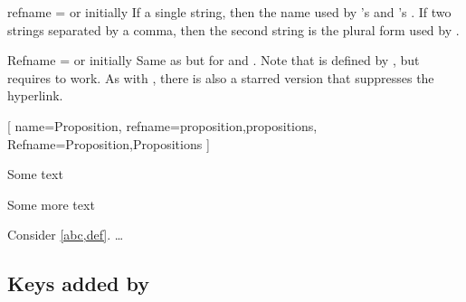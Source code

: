 \documentclass{ltxdoc}
\begin{document}
\begin{docKey}{refname}
  {= \textrm{or} }
  {initially }
If a single string, then the name used by 's  and 's .
If two strings separated by a comma, then the second string is the plural form used by .
\end{docKey}

\begin{docKey}{Refname}
  {= \textrm{or} }
  {initially }
Same as  but for  and .
Note that  is defined by , but requires  to work.
As with , there is also a starred version  that suppresses the hyperlink.

\begin{tcbwritetemp}
[
  name=Proposition,
  refname={proposition,propositions},
  Refname={Proposition,Propositions}
  ]
\end{tcbwritetemp}

\begin{keythmscode}[withpreamble]
\begin{prop}[label=abc]
Some text
\end{prop}
\begin{prop}[label=def]
Some more text
\end{prop}
\begin{theorem}
Consider \cref{abc,def}.  \dots
\end{theorem}
\end{keythmscode}

\end{docKey}

\subsection{Keys added by } \label{thm-added-keys}
\end{document}
